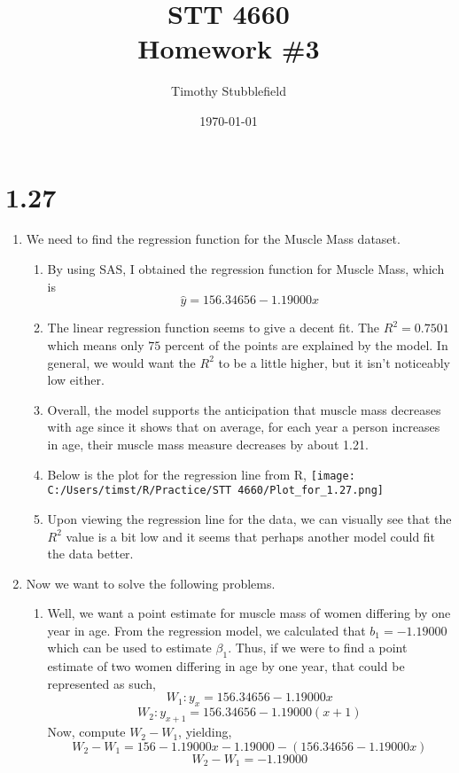 \documentclass{article}
\title{STT 4660 \\ Homework \#3}
\author{Timothy Stubblefield}
\date{\today}
\begin{document}
	
\maketitle

\section*{1.27}
	\begin{enumerate}[label = \alph*)]
		\item We need to find the regression function for the Muscle Mass dataset.
		\begin{enumerate}[label = \arabic*)]
			\item By using SAS, I obtained the regression function for Muscle Mass, which is
				\[\hat{y} = 156.34656 - 1.19000x\]
			\item The linear regression function seems to give a decent fit. 
				The $R^2 = 0.7501$ which means only $75$ percent of the points are explained by the model. In general, we would want the $R^2$ to be a little higher, but it isn't noticeably low either.
			\item Overall, the model supports the anticipation that muscle mass decreases with
			age since it shows that on average, for each year a person increases in age, their muscle mass measure decreases by about 1.21. 
			\item Below is the plot for the regression line from R,
				\centering
				\texttt{[image: C:/Users/timst/R/Practice/STT 4660/Plot\_for\_1.27.png]}
			\item Upon viewing the regression line for the data, we can visually see that the $R^2$ value is  a bit low and it seems that perhaps another model could fit the data better.
		\end{enumerate} 
		\item Now we want to solve the following problems.
		\begin{enumerate}[label = \arabic*)]
			\item Well, we want a point estimate for muscle mass of women differing by one year in age. From the regression model, we calculated that $b_1 = -1.19000$ which can be used to estimate $\beta_1$. Thus, if we were to find a point estimate of two women differing in age by one year, that could be represented as such, 
			\[W_1: y_{x} = 156.34656 - 1.19000x\]
			\[W_2: y_{x+1} = 156.34656 - 1.19000(x+1)\]
			Now, compute $W_2 - W_1$, yielding,
			\[W_2 - W_1 = 156-1.19000x-1.19000 - (156.34656-1.19000x)\]
			\[W_2 - W_1 = -1.19000\]

\end{enumerate}
\end{enumerate}
\end{document}
